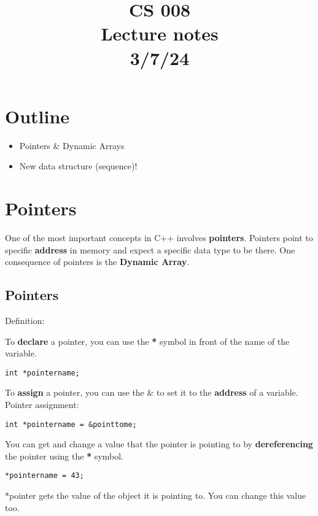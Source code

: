 \documentclass[11pt,a4paper,english]{paper}
\begin{document}
\title{CS 008 \\ Lecture notes \\ 3/7/24}
\maketitle

\section{Outline}

\begin{itemize}
  \item Pointers \& Dynamic Arrays
  \item New data structure (sequence)!
\end{itemize}

\section{Pointers}

One of the most important concepts in C++ involves \textbf{pointers}. Pointers point to specific \textbf{address} in memory and expect a specific data type to be there. One consequence of pointers is the \textbf{Dynamic Array}.   \bigskip

\subsection{Pointers}

\bigskip

\begin{bluebox}{Definition:} {

    \bigskip
    To \textbf{declare} a pointer, you can use the \textbf{*} symbol in front of the name of the variable.

    \texttt{int *pointername;}

    \bigskip

    To \textbf{assign} a pointer, you can use the \& to set it to the \textbf{address} of a variable.
    Pointer assignment:

    \texttt{int *pointername = &pointtome;}

    \bigskip

    You can get and change a value that the pointer is pointing to by \textbf{dereferencing} the pointer using the \textbf{*} symbol.

    \texttt{*pointername = 43;}

    \bigskip
    *pointer gets the value of the object it is pointing to. You can change this value too.

  }
\end{bluebox}
\end{document}
